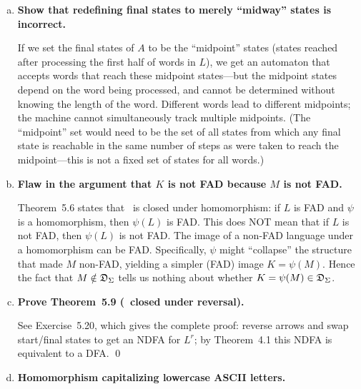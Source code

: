 \begin{enumerate}[{5.}1. ]
\begin{enumerate}[(a)]
\begin{proof}
A clean construction: for each state $s\in S$, define the language $L_s=\{x\mid\DBAR(s,x)\in F\}$ (words that from $s$ lead to acceptance).  Then $L^e=\bigcup_{s\in S}\{y\in\Sigma^{|x|}\mid\DBAR(s_0,y)=s\wedge|y|=|x|\text{ for some }x\in L_s\}$.  The DFA for this: use the pair $(s,t)$ where $s$ tracks the first pointer (advancing via all possible paths, nondeterministically) and $t$ tracks actual input.  Since $S$ is finite, this is a finite NDFA, and $L^e\in\DSIG$. \qed
\end{proof}

\item \textbf{Show that redefining final states to merely ``midway'' states is incorrect.}

If we set the final states of $A$ to be the ``midpoint'' states (states reached after processing the first half of words in $L$), we get an automaton that accepts words that reach these midpoint states---but the midpoint states depend on the word being processed, and cannot be determined without knowing the length of the word.  Different words lead to different midpoints; the machine cannot simultaneously track multiple midpoints.  (The ``midpoint'' set would need to be the set of all states from which any final state is reachable in the same number of steps as were taken to reach the midpoint---this is not a fixed set of states for all words.)

\item \textbf{Flaw in the argument that $K$ is not FAD because $M$ is not FAD.}

Theorem~5.6 states that \DSIG\ is closed under homomorphism: if $L$ is FAD and $\psi$ is a homomorphism, then $\psi(L)$ is FAD.  This does NOT mean that if $L$ is not FAD, then $\psi(L)$ is not FAD.  The image of a non-FAD language under a homomorphism can be FAD.  Specifically, $\psi$ might ``collapse'' the structure that made $M$ non-FAD, yielding a simpler (FAD) image $K=\psi(M)$.  Hence the fact that $M\notin\mathfrak{D}_\Sigma$ tells us nothing about whether $K=\psi(M)\in\mathfrak{D}_\Sigma$.

\item \textbf{Prove Theorem~5.9 (\DSIG\ closed under reversal).}

See Exercise~5.20, which gives the complete proof: reverse arrows and swap start/final states to get an NDFA for $L^r$; by Theorem~4.1 this NDFA is equivalent to a DFA. \qed

\item \textbf{Homomorphism capitalizing lowercase ASCII letters.}


\end{enumerate}
\end{enumerate}
